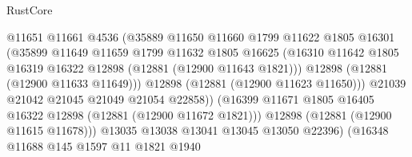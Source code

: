 \begin{lexlean}{RustCore}
\begin{coremodule}
                                      @11651
                                      @11661
                                      @4536
                                      (@35889
                                        @11650
                                        @11660
                                        @1799
                                        @11622
                                        @1805
                                        @16301
                                        (@35899
                                          @11649
                                          @11659
                                          @1799
                                          @11632
                                          @1805
                                          @16625
                                          (@16310
                                            @11642
                                            @1805
                                            @16319
                                            @16322
                                            @12898
                                            (@12881 (@12900 @11643 @1821)))
                                          @12898
                                          (@12881 (@12900 @11633 @11649)))
                                        @12898
                                        (@12881 (@12900 @11623 @11650)))
                                      @21039
                                      @21042
                                      @21045
                                      @21049
                                      @21054
                                      @22858))
                                  (@16399
                                    @11671
                                    @1805
                                    @16405
                                    @16322
                                    @12898
                                    (@12881 (@12900 @11672 @1821)))
                                  @12898
                                  (@12881 (@12900 @11615 @11678)))
                                @13035
                                @13038
                                @13041
                                @13045
                                @13050
                                @22396)
                              (@16348
                                @11688
                                @145
                                @1597
                                @11
                                @1821
                                @1940

\end{coremodule}
\end{lexlean}
